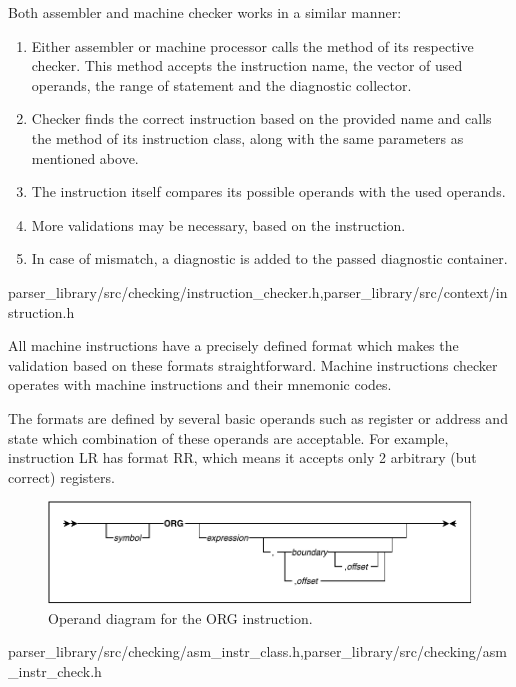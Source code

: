 Both assembler and machine checker works in a similar manner:
\begin{enumerate}
	\item Either assembler or machine processor calls the  method of its respective checker. This method accepts the instruction name, the vector of used operands, the range of statement and the diagnostic collector.
	\item Checker finds the correct instruction based on the provided name and calls the  method of its instruction class, along with the same parameters as mentioned above.
	\item The instruction itself compares its possible operands with the used operands.
	\item More validations may be necessary, based on the instruction.
	\item In case of mismatch, a diagnostic is added to the passed diagnostic container.
\end{enumerate}

{parser\_library/src/checking/instruction\_checker.h,parser\_library/src/context/instruction.h}

All machine instructions have a precisely defined format which makes the validation based on these formats straightforward. Machine instructions checker operates with machine instructions and their mnemonic codes.

The formats are defined by several basic operands such as register or address and state which combination of these operands are acceptable. For example, instruction LR has format RR, which means it accepts only 2 arbitrary (but correct) registers. 

\begin{figure}
	\centering
	\includegraphics[width=\textwidth]{img/org_diagram}
	\caption{Operand diagram for the ORG instruction.}
	
	\label{fig01:check}
\end{figure}

{parser\_library/src/checking/asm\_instr\_class.h,parser\_library/src/checking/asm\_instr\_check.h}
\label{sub:asm_check}

